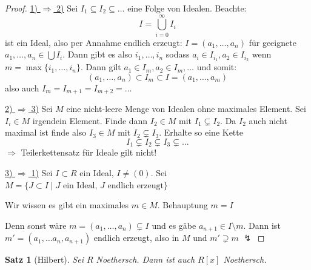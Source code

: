 \documentclass[a4paper,12pt,numbers=noenddot,parskip=full]{scrartcl}
\newcommand{\heading}{\underline}
\theoremstyle{dotless}
\newtheorem{theorem}{Satz}[section]
\theoremstyle{remark}
\begin{document}
	\begin{proof}
		\heading{1) $\Rightarrow$ 2)}
		Sei $I_1 \subseteq I_2 \subseteq \dots$ eine Folge von Idealen. Beachte:
		\begin{equation*}
			I = \bigcup_{i=0}^\infty I_i
		\end{equation*}
		ist ein Ideal, also per Annahme endlich erzeugt: $I = (a_1, \dots, a_n)$ für geeignete $a_1, \dots, a_n \in \bigcup I_i$. Dann gibt es also $i_1, \dots, i_n$ sodass $a_i \in I_{i_1}, a_2 \in I_{i_2}$ wenn $m = \max \{ i_1, \dots, i_n \}$. Dann gilt $a_1 \in I_m, a_2 \in I_m, \dots$ und somit:
		\begin{equation*}
			(a_1, \dots, a_n) \subset I_m \subset I = (a_1, \dots, a_m)
		\end{equation*}
		also auch $I_m = I_{m+1} = I_{m+2} = \dots$
		
		\heading{2) $\Rightarrow$ 3)}
		Sei $M$ eine nicht-leere Menge von Idealen ohne maximales Element. Sei $I_i \in M$ irgendein Element. Finde dann $I_2 \in M$ mit $I_1 \subsetneq I_2$. Da $I_2$ auch nicht maximal ist finde also $I_3 \in M$ mit $I_2 \subsetneq I_3$. Erhalte so eine Kette
		\begin{equation*}
			I_1 \subsetneq I_2 \subsetneq I_3 \subsetneq ...
		\end{equation*}
		$\Rightarrow$ Teilerkettensatz für Ideale gilt nicht!
		
		\heading{3) $\Rightarrow$ 1)}
		Sei $I \subset R$ ein Ideal, $I \neq (0)$. Sei $M = \{ J \subset I \mid \text{$J$ ein Ideal, $J$ endlich erzeugt} \}$
		
		Wir wissen es gibt ein maximales $m \in M$. Behauptung $m = I$
		
		Denn sonst wäre $m = (a_1, \dots, a_n) \subsetneq I$ und es gäbe $a_{n+1} \in I \setminus m$. Dann ist $m' = (a_1, \dots a_n, a_{n+1})$ endlich erzeugt, also in $M$ und $m' \supsetneq m$ $\lightning$
	\end{proof}

	\begin{theorem}[Hilbert]
		Sei $R$ Noethersch. Dann ist auch $R[x]$ Noethersch.
	\end{theorem}
\end{document}
